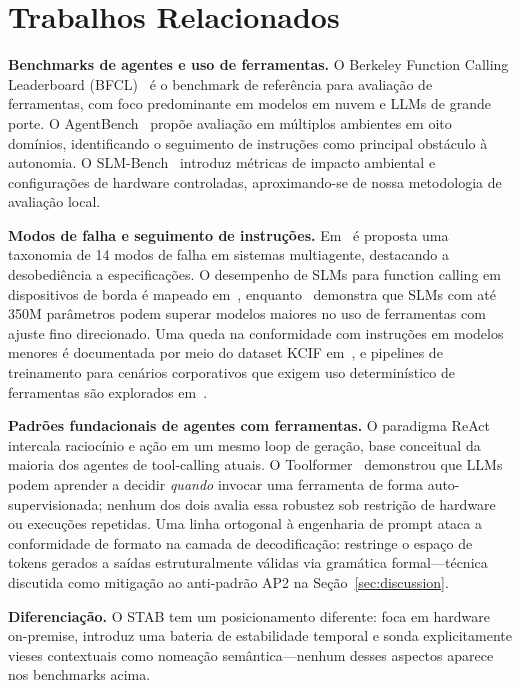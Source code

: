 \documentclass{kdmile}
\begin{document}
\section{Trabalhos Relacionados}
\label{sec:related}

\textbf{Benchmarks de agentes e uso de ferramentas.}
O Berkeley Function Calling Leaderboard (BFCL)~\cite{patil2025} é o benchmark
de referência para avaliação de ferramentas, com foco predominante em modelos
em nuvem e LLMs de grande porte.
O AgentBench~\cite{liu2024} propõe avaliação em múltiplos ambientes em oito
domínios, identificando o seguimento de instruções como principal obstáculo à
autonomia.
O SLM-Bench~\cite{pham2025} introduz métricas de impacto ambiental e
configurações de hardware controladas, aproximando-se de nossa metodologia de
avaliação local.

\textbf{Modos de falha e seguimento de instruções.}
Em~\cite{cemri2025} é proposta uma taxonomia de 14 modos de falha em
sistemas multiagente, destacando a desobediência a especificações.
O desempenho de SLMs para function calling em dispositivos de borda é mapeado
em~\cite{kavathekar2025}, enquanto~\cite{jhandi2026} demonstra que SLMs com até
350M parâmetros podem superar modelos maiores no uso de ferramentas com ajuste
fino direcionado. Uma queda na conformidade com instruções em modelos menores é
documentada por meio do dataset KCIF em~\cite{murthy2024}, e pipelines de
treinamento para cenários corporativos que exigem uso determinístico de
ferramentas são explorados em~\cite{zeng2024}.

\textbf{Padrões fundacionais de agentes com ferramentas.}
O paradigma ReAct~\cite{yao2023} intercala raciocínio e ação em um mesmo loop de
geração, base conceitual da maioria dos agentes de tool-calling atuais. O
Toolformer~\cite{schick2023} demonstrou que LLMs podem aprender a decidir
\emph{quando} invocar uma ferramenta de forma auto-supervisionada; nenhum dos
dois avalia essa robustez sob restrição de hardware ou execuções repetidas. Uma
linha ortogonal à engenharia de prompt ataca a conformidade de formato na
camada de decodificação: \cite{geng2023} restringe o espaço de tokens gerados a
saídas estruturalmente válidas via gramática formal—\allowbreak técnica discutida como
mitigação ao anti-padrão AP2 na Seção~\ref{sec:discussion}.

\textbf{Diferenciação.}
O STAB tem um posicionamento diferente: foca em hardware on-premise, introduz
uma bateria de estabilidade temporal e sonda explicitamente vieses contextuais
como nomeação semântica—\allowbreak nenhum desses aspectos aparece nos benchmarks acima.
\end{document}
